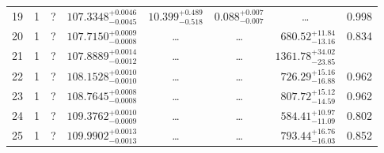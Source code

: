 \begin{table*}[!]
\begin{tabular}{llcrrlrc}
19 & 1 & ? & $    107.3348_{-      0.0045}^{+      0.0046}$ & $      10.399_{-       0.518}^{+       0.489}$ & $       0.088_{-       0.007}^{+       0.007}$ & \multicolumn{1}{c}{\dots} & 0.998\\[1pt]
20 & 1 & ? & $    107.7150_{-      0.0008}^{+      0.0009}$ & \multicolumn{1}{c}{\dots} & \multicolumn{1}{c}{\dots} & $      680.52_{-       13.16}^{+       11.84}$ & 0.834\\[1pt]
21 & 1 & ? & $    107.8889_{-      0.0012}^{+      0.0014}$ & \multicolumn{1}{c}{\dots} & \multicolumn{1}{c}{\dots} & $     1361.78_{-       23.85}^{+       34.02}$ & \\[1pt]
22 & 1 & ? & $    108.1528_{-      0.0010}^{+      0.0010}$ & \multicolumn{1}{c}{\dots} & \multicolumn{1}{c}{\dots} & $      726.29_{-       16.88}^{+       15.16}$ & 0.962\\[1pt]
23 & 1 & ? & $    108.7645_{-      0.0008}^{+      0.0008}$ & \multicolumn{1}{c}{\dots} & \multicolumn{1}{c}{\dots} & $      807.72_{-       14.59}^{+       15.12}$ & 0.962\\[1pt]
24 & 1 & ? & $    109.3762_{-      0.0009}^{+      0.0010}$ & \multicolumn{1}{c}{\dots} & \multicolumn{1}{c}{\dots} & $      584.41_{-       11.09}^{+       10.97}$ & 0.802\\[1pt]
25 & 1 & ? & $    109.9902_{-      0.0013}^{+      0.0013}$ & \multicolumn{1}{c}{\dots} & \multicolumn{1}{c}{\dots} & $      793.44_{-       16.03}^{+       16.76}$ & 0.852\\[1pt]


\end{tabular}
\end{table*}
